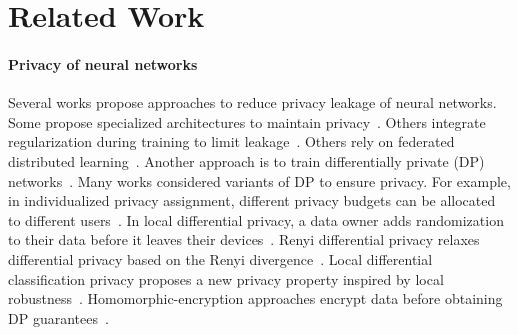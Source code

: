 \section{Related Work}
\label{sec:related_work}

\begin{comment}
\paragraph{Privacy in neural networks}
Several works propose privacy attacks in neural networks, shown to be effective even in settings where only labels are accessible~\citep{ref_12,ref_13,ref_14}. %
Other works propose approaches to reduce privacy leakage. 
Some works suggest networks with specialized architectures designed for privacy~\cite{ref_16,ref_17}. 
Others integrate regularization terms during training to limit the privacy leakage~\cite{ref_18, ref_19, ref_20}. 
Others provide probabilistic guarantees by relying on federated distributed training~\cite{ref_21,ref_34,ref_57} or training differentially private networks~\cite{ref_22,ref_36,ref_37,ref_58,ref_59,ref_60,ref_61,ref_62}.  
A recent work introduces the property local differential classification privacy and provides for it probabilistic guarantees~\cite{ref_8}. 

\end{comment}


\paragraph{Privacy of neural networks}
Several works propose approaches to reduce privacy leakage of neural networks. 
Some propose specialized architectures to maintain privacy~\cite{ref_16,ref_17}. 
Others integrate regularization during training to limit leakage~\cite{ref_18, ref_19}. 
Others rely on federated distributed learning~\cite{ref_21,ref_34,ref_57}. 
Another approach is to train differentially private (DP) networks~\cite{ref_22,ref_36,ref_37,ref_58,ref_59,ref_60}. 
Many works considered variants of DP to ensure privacy. For example, in individualized privacy assignment, different privacy budgets can be allocated to different users~\cite{ref_94,ref_95}. 
In local differential privacy, a data owner adds randomization to their data before it leaves their devices~\cite{ref_60,ref_97}. Renyi differential privacy relaxes differential privacy based on the Renyi divergence~\cite{ref_98,ref_99}. Local differential classification privacy proposes a new privacy property inspired by local robustness~\cite{ref_8}. Homomorphic-encryption approaches encrypt data before obtaining DP guarantees~\cite{ref_100,ref_101}. 
 

